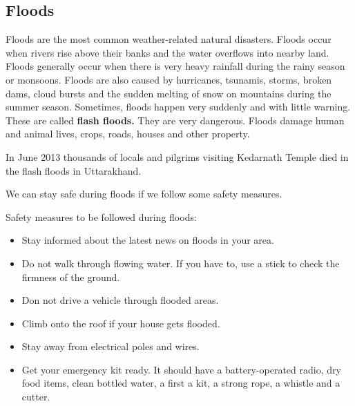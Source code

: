 \subsection{\textbf{Floods}}
Floods are the most common weather-related natural disasters. Floods occur when rivers rise above their banks and the water overflows into nearby land. Floods generally occur when there is very heavy rainfall during the rainy season or monsoons. Floods are also caused by hurricanes, tsunamis, storms, broken dams, cloud bursts and the sudden melting of snow on mountains during the summer season. Sometimes, floods happen very suddenly and with little warning. These are called \textbf{flash floods.} They are very dangerous. Floods damage human and animal lives, crops, roads, houses and other property.
\vspace{0.1in}
\par
In June 2013 thousands of locals and pilgrims visiting Kedarnath Temple died in the flash floods in Uttarakhand.
\vspace{0.1in}
\par
We can stay safe during floods if we follow some safety measures.
\vspace{0.1in}
\par
Safety measures to be followed during floods:
\begin{itemize}
    \item Stay informed about the latest news on floods in your area.
    \item Do not walk through flowing water. If you have to, use a stick to check the firmness of the ground.
    \item Don not drive a vehicle through flooded areas.
    \item Climb onto the roof if your house gets flooded.
    \item Stay away from electrical poles and wires.
    \item Get your emergency kit ready. It should have a battery-operated radio, dry food items, clean bottled water, a first a kit, a strong rope, a whistle and a cutter.
\end{itemize}
\vspace{0.4in}
